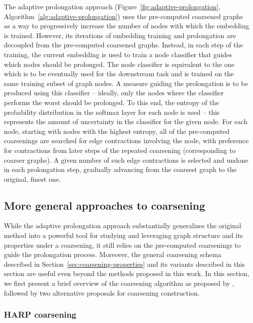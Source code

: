 The adaptive prolongation approach (Figure~\ref{fig:adaptive-prolongation}, Algorithm~\ref{alg:adaptive-prolongation}) uses the pre-computed coarsened graphs as a way to progressively increase the number of nodes with which the embedding is trained. However, its iterations of embedding training and prolongation are decoupled from the pre-computed coarsened graphs. Instead, in each step of the training, the current embedding is used to train a node classifier that guides which nodes should be prolonged. The node classifier is equivalent to the one which is to be eventually used for the downstream task and is trained on the same training subset of graph nodes. A measure guiding the prolongation is to be produced using this classifier -- ideally, only the nodes where the classifier performs the worst should be prolonged. To this end, the entropy of the probability distribution in the softmax layer for each node is used -- this represents the amount of uncertainty in the classifier for the given node. For each node, starting with nodes with the highest entropy, all of the pre-computed coarsenings are searched for edge contractions involving the node, with preference for contractions from later steps of the repeated coarsening (corresponding to coarser graphs). A given number of such edge contractions is selected and undone in each prolongation step, gradually advancing from the coarsest graph to the original, finest one.

\subsection{More general approaches to coarsening}\label{sec:coarsening-algorithms}

While the adaptive prolongation approach substantially generalizes the original method into a powerful tool for studying and leveraging graph structure and its properties under a coarsening, it still relies on the pre-computed coarsenings to guide the prolongation process. Moreover, the general coarsening schema described in Section~\ref{sec:coarsening-properties} and its variants described in this section are useful even beyond the methods proposed in this work. In this section, we first present a brief overview of the coarsening algorithm as proposed by \cite{chen_harp_2018}, followed by two alternative proposals for coarsening construction.

\subsubsection{HARP coarsening}\label{sec:harp-coarsening}

